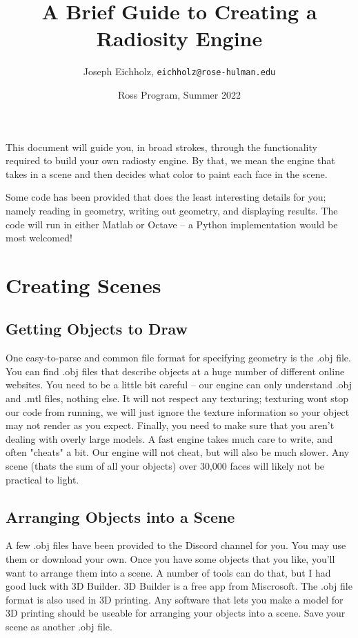 \documentclass{article}
\title{A Brief Guide to Creating a Radiosity Engine}
\date{Ross Program, Summer 2022}
\author{Joseph Eichholz, \texttt{eichholz@rose-hulman.edu}}
\begin{document}
\maketitle
This document will guide you, in broad strokes, through the functionality required to build your own radiosty
engine.  By that, we mean the engine that takes in a scene and then decides what color to paint each face in the scene. 

Some code has been provided that does the least interesting details for you; namely reading in geometry, writing out geometry, and displaying results.  The code will run in either Matlab or Octave -- a Python implementation would be most welcomed!

\section*{Creating Scenes}  
\subsection*{Getting Objects to Draw}
One easy-to-parse and common file format for specifying geometry is the .obj file.   You can find .obj files that describe objects at a huge number of different online websites.  You need to be a little bit careful -- our engine can only understand .obj and .mtl files, nothing else.  It will not respect any texturing; texturing wont stop our code from running, we will just ignore the texture information so your object may not render as you expect.  Finally, you need to make sure that you aren't dealing with overly large models.  A fast engine takes much care to write, and often "cheats" a bit.  Our engine will not cheat, but will also be much slower.  Any scene (thats the sum of all your objects) over 30,000 faces will likely not be practical to light.  

\subsection*{Arranging Objects into a Scene}
A few .obj files have been provided to the Discord channel for you.  You may use them or download your own.  Once you have some objects that you like, you'll want to arrange them into a scene.  A number of tools can do that, but I had good luck with 3D Builder.  3D Builder is a free app from Miscrosoft.  The .obj file format is also used in 3D printing.  Any software that lets you make a model for 3D printing should be useable for arranging your objects into a scene. Save your scene as another .obj file. 
\end{document}

